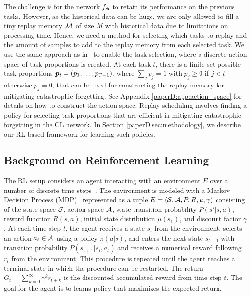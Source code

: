 The challenge is for the network $f_{{\bm{\phi}}}$ to retain its performance on the previous tasks. However, as the historical data can be huge, we are only allowed to fill a tiny replay memory ${\mathcal{M}}$ of size $M$ with historical data due to limitations on processing time. Hence, we need a method for selecting which tasks to replay and the amount of samples to add to the replay memory from each selected task. We use the same approach as in~ to enable the task selection, 
where a discrete action space of task proportions is created. At each task $t$, there is a finite set possible task proportions ${\bm{p}}_t = (p_1, \dots, p_{T-1})$, where $\sum_j p_j = 1$ with $p_j \geq 0$ if $j < t$ otherwise $p_j = 0$, that can be used for constructing the replay memory for mitigating catastrophic forgetting. See Appendix \ref{paperD:app:action_space} for details on how to construct the action space. 
Replay scheduling involves finding a policy for selecting task proportions that are efficient in mitigating catastrophic forgetting in the CL network. In Section \ref{paperD:sec:methodology}, we describe our RL-based framework for learning such policies. 


\subsection{Background on Reinforcement Learning}

The RL setup considers an agent interacting with an environment $E$ over a number of discrete time steps~. The environment is modeled with a Markov Decision Process (MDP)~ represented as a tuple $E = ({\mathcal{S}}, {\mathcal{A}}, P, R, \mu, \gamma)$ consisting of the state space ${\mathcal{S}}$, action space ${\mathcal{A}}$, state transition probability $P(s' | s, a)$, reward function $R(s, a)$, initial state distribution $\mu(s_1)$, and discount factor $\gamma$. At each time step $t$, the agent receives a state $s_t$ from the environment, selects an action $a_t \in {\mathcal{A}}$ using a policy $\pi(a | s)$, and enters the next state $s_{t+1}$ with transition probability $P(s_{t+1} | s_t, a_t)$ and receives a numerical reward following $r_t$ from the environment. This procedure is repeated until the agent reaches a terminal state in which the procedure can be restarted. The return $G_t = \sum_{k=0}^{\infty} \gamma^{k} r_{t+k}$ is the discounted accumulated reward from time step $t$. The goal for the agent is to learns  policy that maximizes the expected return.

